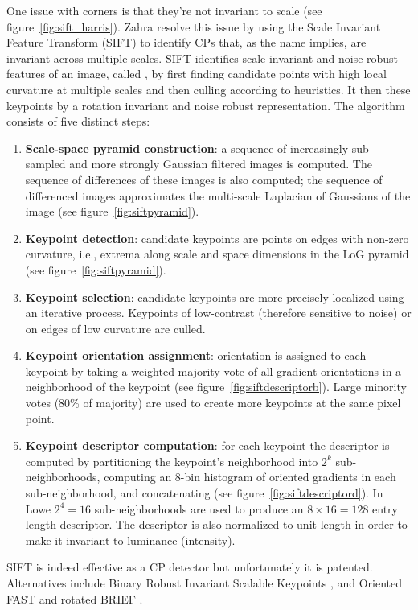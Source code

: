 One issue with corners is that they're not invariant to scale (see figure~\ref{fig:sift_harris}).
%
Zahra \etal \cite{zahrasift} resolve this issue by using the Scale Invariant Feature Transform \cite{lowe2004distinctive} (SIFT) to identify CPs that, as the name implies, are invariant across multiple scales.
%
SIFT identifies scale invariant and noise robust features of an image, called , by first finding candidate points with high local curvature at multiple scales and then culling according to heuristics.
%
It then  these keypoints by a rotation invariant and noise robust representation.
%
The algorithm consists of five distinct steps:
%
\begin{mdframed}
	\begin{enumerate}
		\item \textbf{Scale-space pyramid construction}: a sequence of increasingly sub-sampled and more strongly Gaussian filtered images is computed. The sequence of differences of these images is also computed; the sequence of differenced images approximates the multi-scale Laplacian of Gaussians of the image (see figure~\ref{fig:siftpyramid}).
		\item \textbf{Keypoint detection}: candidate keypoints are points on edges with non-zero curvature, i.e., extrema along scale and space dimensions in the LoG pyramid (see figure~\ref{fig:siftpyramid}).
		\item \textbf{Keypoint selection}: candidate keypoints are more precisely localized using an iterative process. Keypoints of low-contrast (therefore sensitive to noise) or on edges of low curvature are culled.
		\item \textbf{Keypoint orientation assignment}: orientation is assigned to each keypoint by taking a weighted majority vote of all gradient orientations in a neighborhood of the keypoint (see figure~\ref{fig:siftdescriptorb}). Large minority votes (80\% of majority) are used to create more keypoints at the same pixel point.
		\item \textbf{Keypoint descriptor computation}: for each keypoint the descriptor is computed by partitioning the keypoint's neighborhood into \(2^k\) sub-neighborhoods, computing an 8-bin histogram of oriented gradients in each sub-neighborhood, and concatenating (see figure~\ref{fig:siftdescriptord}). In Lowe \etal \(2^4=16\) sub-neighborhoods are used to produce an \(8\times16 = 128\) entry length descriptor. The descriptor is also normalized to unit length in order to make it invariant to luminance (intensity).
	\end{enumerate}
\end{mdframed}
\noindent SIFT is indeed effective as a CP detector but unfortunately it is patented. Alternatives include Binary Robust Invariant Scalable Keypoints \cite{leutenegger2011brisk}, and Oriented FAST and rotated BRIEF \cite{rublee2011orb}.
%

%
